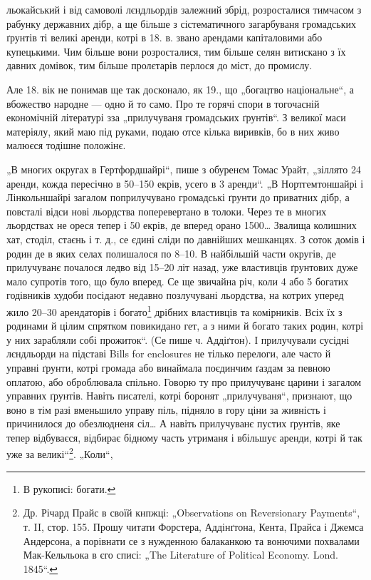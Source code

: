 \parcont{}
льокайський і від самоволі лєндльордів залежний збрід, розросталися тимчасом з рабунку державних
дібр, а ще більше з сістематичного загарбуваня громадських ґрунтів ті великі аренди, котрі в 18. в.
звано арендами капіталовими або купецькими. Чим більше вони розросталися, тим більше селян витискано
з їх давних домівок, тим більше пролєтарів перлося до міст, до промислу.

Але 18. вік не понимав ще так досконало, як 19., що „богацтво національне“, а вбожество народне —
одно й то само. Про те горячі спори в тогочасній економічній літературі зза „прилучуваня громадських
ґрунтів“. З великої
маси матеріялу, який маю під руками, подаю отсе кілька виривків, бо в них живо малюєся тодішне
положінє.

„В многих округах в Гертфордшайрі“, пише з обуренєм Томас Урайт, „зіллято 24 аренди, кожда пересічно
в 50--150 екрів, усего в 3 аренди“. „В Нортгемтоншайрі і Лінкольншайрі загалом поприлучувано
громадські ґрунти до приватних дібр, а повсталі відси нові льордства поперевертано в толоки. Через
те в многих льордствах не ореся тепер і 50 екрів, де вперед орано 1500\dots{} Звалища колишних хат,
стоділ, стаєнь і т. д., се єдині сліди по давнійших мешканцях. З соток домів і родин де в яких селах
полишалося по 8--10. В найбільшій части округів, де прилучуванє почалося ледво від 15--20 літ назад,
уже властивців ґрунтових дуже мало супротів того, що було вперед. Се ще звичайна річ, коли 4 або 5
богатих годівників худоби посідают недавно позлучувані льордства, на котрих уперед жило 20--30
арендаторів і богато\footnote*{
В рукописі: богати.
} дрібних властивців та комірників. Всіх їх з родинами й цілим спрятком
повикидано гет, а з ними й богато таких родин, котрі у них зарабляли собі прожиток“. (Се пише ч.
Аддіґтон). І прилучували сусідні лєндльорди на підставі Bills for enclosures не тілько перелоги, але
часто й управні ґрунти, котрі громада або винаймала поєдинчим ґаздам за певною оплатою, або
оброблювала спільно. Говорю ту про прилучуванє царини
і загалом управних ґрунтів. Навіть писателі, котрі боронят „прилучуваня“, признают, що воно в тім
разі вменьшило управу піль, підняло в гору ціни за живність і причинилося до обезлюдненя сіл\dots{} А
навіть прилучуванє пустих ґрунтів, яке тепер відбуваєся, відбирає бідному часть утриманя
і вбільшує аренди, котрі й так уже за великі“\footnote{
Др. Річард Прайс в своїй кнпжці: „Observations on Reversionary
Payments“, т. II, стор. 155. Прошу читати Форстера, Аддінґтона, Кента,
Прайса і Джемса Андерсона, а порівнати се з нужденною балаканкою
та вонючими похвалами Мак-Кельльока в єго списі: „The Literature of
Political Economy. Lond. 1845“.
}. „Коли“,
\parbreak{}
